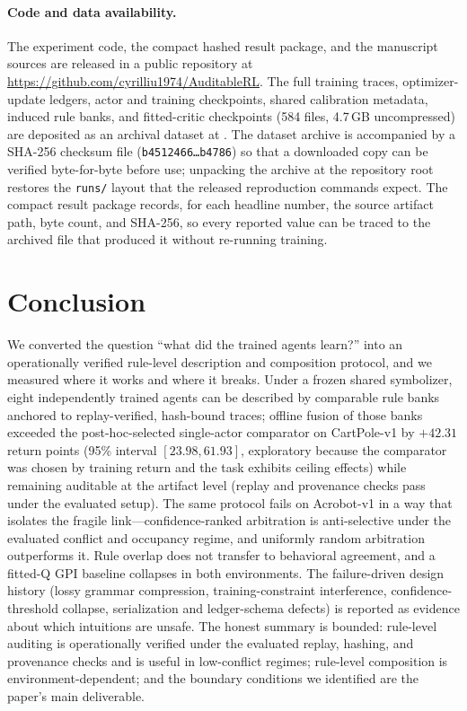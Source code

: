 \documentclass[11pt]{article}
\begin{document}
\paragraph{Code and data availability.}
The experiment code, the compact hashed result package, and the manuscript sources are released in a
public repository at \url{https://github.com/cyrilliu1974/AuditableRL}. The full training traces,
optimizer-update ledgers, actor and training checkpoints, shared calibration metadata, induced rule
banks, and fitted-critic checkpoints (584 files, 4.7\,GB uncompressed) are deposited as an archival
dataset at \cite{liu2026auditablerl}. The dataset archive is accompanied by a SHA-256 checksum file
(\texttt{b4512466\ldots b4786}) so that a downloaded copy can be verified byte-for-byte before use;
unpacking the archive at the repository root restores the \texttt{runs/} layout that the released
reproduction commands expect. The compact result package records, for each headline number, the
source artifact path, byte count, and SHA-256, so every reported value can be traced to the
archived file that produced it without re-running training.

\section{Conclusion}
\label{sec:conclusion}

We converted the question ``what did the trained agents learn?'' into an operationally verified
rule-level
description and composition protocol, and we measured where it works and where it breaks. Under a
frozen shared symbolizer, eight independently trained agents can be described by comparable rule
banks anchored to replay-verified, hash-bound traces; offline fusion of those banks exceeded the
post-hoc-selected single-actor comparator on CartPole-v1 by $+42.31$ return points (95\% interval
$[23.98,61.93]$, exploratory because the comparator was chosen by training return and the task
exhibits ceiling effects) while
remaining auditable at the artifact level (replay and provenance checks pass under the evaluated
setup). The same protocol fails on Acrobot-v1 in a way that isolates the
fragile link---confidence-ranked arbitration is anti-selective under the evaluated conflict and
occupancy regime, and
uniformly random arbitration outperforms it. Rule overlap does not transfer to behavioral
agreement, and a fitted-Q GPI baseline collapses in both environments. The failure-driven design
history (lossy grammar compression, training-constraint interference, confidence-threshold collapse,
serialization and ledger-schema defects) is reported as evidence about which intuitions are unsafe.
The honest summary is bounded: rule-level auditing is operationally verified under the evaluated
replay, hashing, and provenance checks and is useful in low-conflict regimes;
rule-level composition is environment-dependent; and the boundary conditions we identified are the
paper's main deliverable.
\end{document}
